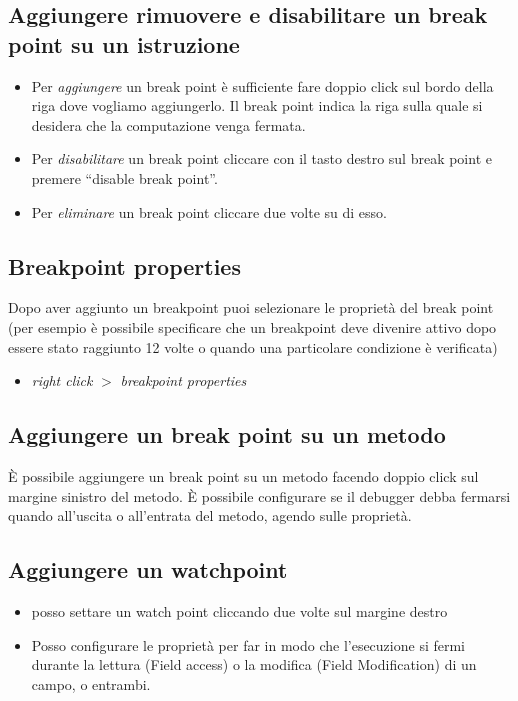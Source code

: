 \documentclass{article}
\begin{document}
\subsection{Aggiungere rimuovere e disabilitare un break point su un istruzione}
\begin{itemize}
\item Per \textit{aggiungere} un break point \`e sufficiente fare doppio click sul bordo della riga dove vogliamo aggiungerlo. Il break point indica la riga sulla quale si desidera che la computazione venga fermata.
\item  Per \textit{disabilitare} un break point cliccare con il tasto destro sul break point e premere ``disable break point''.
\item  Per \textit{eliminare} un break point cliccare due volte su di esso.
\end{itemize}

\subsection{Breakpoint properties}
Dopo aver aggiunto un breakpoint puoi selezionare le propriet\`a del break point (per esempio \`e possibile specificare che un breakpoint deve divenire attivo dopo  essere stato raggiunto 12 volte o quando una particolare condizione \`e verificata)
\begin{itemize}
\item \textit{right click} $>$ \textit{breakpoint properties}
\end{itemize}


\subsection{Aggiungere un break point su un metodo}
\`E possibile aggiungere un break point su un metodo facendo doppio click sul margine sinistro del metodo.
\`E possibile configurare se il debugger debba fermarsi quando all'uscita o all'entrata del metodo, agendo sulle propriet\`a.

\subsection{Aggiungere un watchpoint}
\begin{itemize}
\item posso settare un watch point cliccando due volte sul margine destro
\item  Posso configurare le propriet\`a per far in modo che l'esecuzione si fermi durante la lettura (Field access)  o la modifica (Field Modification) di un campo, o entrambi.
\end{itemize}
\end{document}
